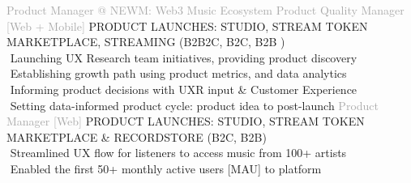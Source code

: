 \begin{cvtable}
    {\textcolor{darkgray} {Product Manager \newline @ NEWM: Web3 Music Ecosystem } }
    { }{{ {    } }}
%
    {\textcolor{darkgray}
    {
    Product Quality Manager [Web + Mobile] %
    }
    }
    { }%
    {
    {
    {\scriptsize
    PRODUCT LAUNCHES:
    STUDIO,
    STREAM TOKEN MARKETPLACE,
    STREAMING
    (B2B2C,
    B2C,
    B2B%
    )
    } \\
        \textperiodcentered $ $ Launching UX Research team initiatives,
providing product discovery \\
     \textperiodcentered $ $ Establishing growth path using product metrics, and data analytics \\
          \textperiodcentered $ $ Informing product decisions
          with UXR input \& Customer Experience
          \\
     \textperiodcentered $ $ Setting data-informed product cycle:
     product idea to post-launch %
    }} %
%
    {\textcolor{darkgray}{
    Product 
    Manager
    [Web]
    }}%
    {
    }%
    {%
    {\scriptsize
    PRODUCT
    LAUNCHES:
    STUDIO,
    STREAM TOKEN MARKETPLACE \&
    RECORDSTORE
    (B2C, B2B)
    } \\
\textperiodcentered $ $ Streamlined UX flow for listeners to access music from 100+ artists \\
\textperiodcentered $ $ Enabled the first 50+ monthly active users [MAU] to platform \\
}
\end{cvtable}
